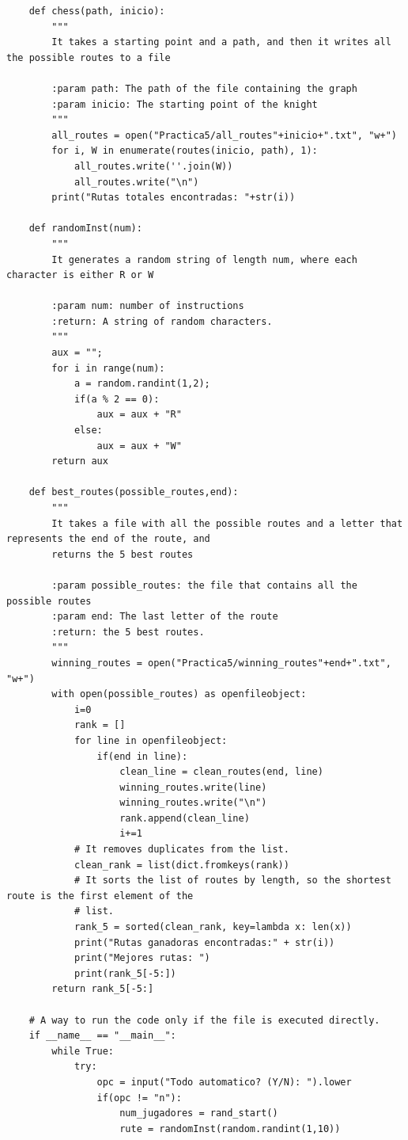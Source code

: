 \documentclass{article}
\begin{document}
\begin{lstlisting}
    def chess(path, inicio):
        """
        It takes a starting point and a path, and then it writes all the possible routes to a file
        
        :param path: The path of the file containing the graph
        :param inicio: The starting point of the knight
        """
        all_routes = open("Practica5/all_routes"+inicio+".txt", "w+")
        for i, W in enumerate(routes(inicio, path), 1):
            all_routes.write(''.join(W))
            all_routes.write("\n")
        print("Rutas totales encontradas: "+str(i))
    
    def randomInst(num):
        """
        It generates a random string of length num, where each character is either R or W
        
        :param num: number of instructions
        :return: A string of random characters.
        """
        aux = "";
        for i in range(num):
            a = random.randint(1,2);
            if(a % 2 == 0):
                aux = aux + "R"
            else:
                aux = aux + "W"
        return aux
    
    def best_routes(possible_routes,end):
        """
        It takes a file with all the possible routes and a letter that represents the end of the route, and
        returns the 5 best routes
        
        :param possible_routes: the file that contains all the possible routes
        :param end: The last letter of the route
        :return: the 5 best routes.
        """
        winning_routes = open("Practica5/winning_routes"+end+".txt", "w+")
        with open(possible_routes) as openfileobject:
            i=0
            rank = []
            for line in openfileobject:
                if(end in line):
                    clean_line = clean_routes(end, line)
                    winning_routes.write(line)
                    winning_routes.write("\n")
                    rank.append(clean_line)
                    i+=1
            # It removes duplicates from the list.
            clean_rank = list(dict.fromkeys(rank))
            # It sorts the list of routes by length, so the shortest route is the first element of the
            # list.
            rank_5 = sorted(clean_rank, key=lambda x: len(x))
            print("Rutas ganadoras encontradas:" + str(i))
            print("Mejores rutas: ")
            print(rank_5[-5:])
        return rank_5[-5:]
                    
    # A way to run the code only if the file is executed directly.
    if __name__ == "__main__":
        while True:
            try:
                opc = input("Todo automatico? (Y/N): ").lower
                if(opc != "n"):
                    num_jugadores = rand_start()
                    rute = randomInst(random.randint(1,10))
                

\end{lstlisting}
\end{document}
